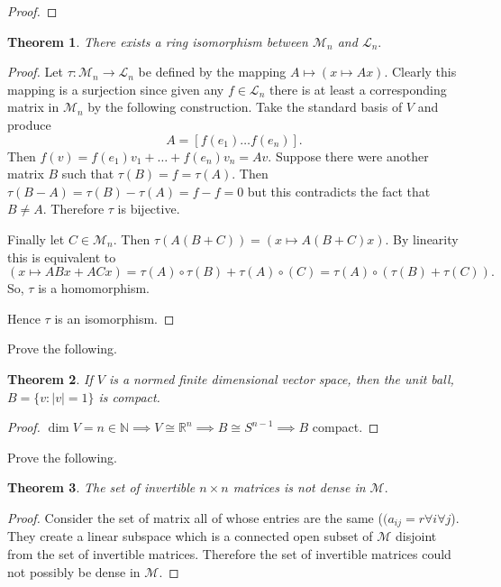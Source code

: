 \documentclass[letter]{article}
\newtheorem{theorem}{Theorem}
\newenvironment{menumerate}{%
  \edef\backupindent{\the\parindent}%
  \enumerate%
  \setlength{\parindent}{\backupindent}%
}{\endenumerate}
\begin{document}
\begin{menumerate}
\begin{proof}
	\end{proof}

	\begin{theorem}
	There exists a ring isomorphism between $\mathcal{M}_n$ and $\mathcal{L}_n.$
	\end{theorem}
	\begin{proof}
	Let $\tau : \mathcal{M}_n \to \mathcal{L}_n$ be defined by the mapping $A \mapsto (x \mapsto Ax).$ 
	Clearly this mapping is a surjection since given any $f \in \mathcal{L}_n$ there is at least a corresponding matrix
	in $\mathcal{M}_n$ by the following construction. Take the standard basis of $V$ and produce $$A = [f(e_1) \dots f(e_n)].$$
	Then $f(v) = f(e_1)v_1 + \dots + f(e_n)v_n = Av.$ Suppose there were another matrix $B$ such that 
	$\tau(B) = f = \tau(A)$. Then $\tau(B - A) = \tau(B) - \tau(A) = f - f = 0$ but this contradicts the fact
	that $B \neq A$. Therefore $\tau$ is bijective.

	Finally let $C \in \mathcal{M}_n.$ Then $\tau(A(B+C)) = (x \mapsto A(B+C)x).$ By linearity this is
	 equivalent to $(x \mapsto ABx + ACx) = \tau(A) \circ \tau(B) + \tau(A) \circ(C) = \tau(A) \circ (\tau(B) + \tau(C)).$ So,
	 $\tau$ is a homomorphism.

	 Hence $\tau$ is an isomorphism.  
	\end{proof}


	\setcounter{enumi}{11}
	\item Prove the following.
	\begin{theorem}
		If $V$ is a normed finite dimensional vector space, then the unit ball, $B = \{v:|v| =1\}$ is compact.
	\end{theorem}
	\begin{proof}
	$\dim V = n \in \mathbb{N} \implies V \cong \mathbb{R}^n \implies B \cong S^{n-1 } \implies B$ compact.	 
	\end{proof} 

	\item Prove the following.
	\begin{theorem}
		The set of invertible $n\times n$ matrices is not dense in $\mathcal{M}.$
	\end{theorem}
	\begin{proof}
		Consider the set of matrix all of whose entries are the same ($(a_{ij} = r \forall i \forall j$). They create a linear subspace
		which is a connected open subset of $\mathcal{M}$ disjoint from the set of invertible matrices. Therefore the set of invertible matrices could
		not possibly be dense in $\mathcal{M}.$	 
	\end{proof}
\end{menumerate}
\end{document}
